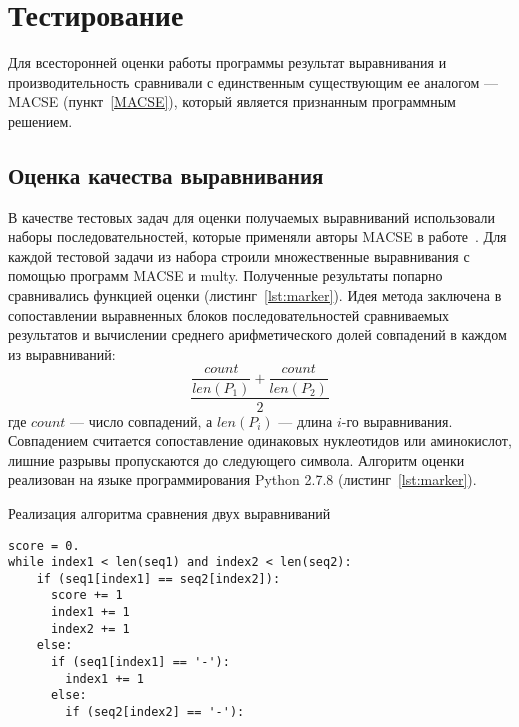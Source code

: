 \clearpage
\newpage

\section[Тестирование]{\large \centering Тестирование}
\hspace{\parindent} Для всесторонней оценки работы программы результат выравнивания и производительность сравнивали с единственным существующим ее аналогом --- MACSE (пункт~\ref{MACSE}), который является признанным программным решением. 

\subsection[Оценка качества выравнивания]{\large Оценка качества выравнивания}
\hspace{\parindent} В качестве тестовых задач для оценки получаемых выравниваний использовали наборы последовательностей, которые применяли авторы MACSE в работе~\cite{MACSE}. Для каждой тестовой задачи из набора строили множественные выравнивания с помощью программ MACSE и multy. Полученные результаты попарно сравнивались функцией оценки (листинг~\ref{lst:marker}). Идея метода заключена в сопоставлении выравненных блоков последовательностей сравниваемых результатов и вычислении среднего арифметического долей совпадений в каждом из выравниваний:
\begin{equation*}
\dfrac{\dfrac{count}{len(P_1)} + \dfrac{count}{len(P_2)}}{2}
\end{equation*}
где $count$ --- число совпадений, а $len(P_i)$ --- длина $i$-го выравнивания. Совпадением считается сопоставление одинаковых нуклеотидов или аминокислот, лишние разрывы пропускаются до следующего символа. Алгоритм оценки реализован на языке программирования Python 2.7.8 (листинг~\ref{lst:marker}).
\begin{algorithm}
	\caption{Реализация алгоритма сравнения двух выравниваний} \label{lst:marker}
	\begin{lstlisting}
score = 0.
while index1 < len(seq1) and index2 < len(seq2):
    if (seq1[index1] == seq2[index2]):
      score += 1
      index1 += 1
      index2 += 1
    else:
      if (seq1[index1] == '-'):
        index1 += 1
      else:
        if (seq2[index2] == '-'):
	\end{lstlisting}
\end{algorithm}

